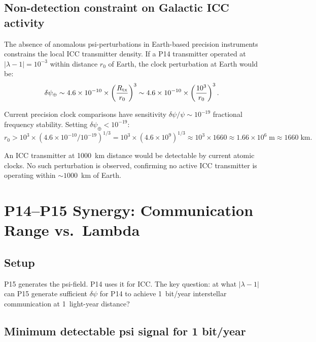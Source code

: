 \documentclass[11pt]{article}
\newcommand{\ee}[1]{\times 10^{#1}}
\begin{document}
\subsection{Non-detection constraint on Galactic ICC activity}

The absence of anomalous psi-perturbations in Earth-based precision
instruments constrains the local ICC transmitter density. If a
P14 transmitter operated at $|\lambda-1| = 10^{-3}$ within
distance $r_0$ of Earth, the clock perturbation at Earth would be:
\begin{equation}
\delta\psi_\oplus \sim 4.6\ee{-10} \times \left(\frac{R_{\rm tx}}{r_0}\right)^3
\sim 4.6\ee{-10} \times \left(\frac{10^3}{r_0}\right)^3.
\end{equation}

Current precision clock comparisons have sensitivity
$\delta\psi/\psi \sim 10^{-19}$ fractional frequency stability.
Setting $\delta\psi_\oplus < 10^{-19}$:
\begin{equation}
r_0 > 10^3 \times (4.6\ee{-10}/10^{-19})^{1/3} = 10^3 \times (4.6\ee{9})^{1/3}
\approx 10^3 \times 1660 \approx 1.66\ee{6}\;\text{m} \approx 1660\;\text{km}.
\end{equation}

An ICC transmitter at 1000~km distance would be detectable by
current atomic clocks. No such perturbation is observed, confirming
no active ICC transmitter is operating within $\sim 1000$~km of Earth.

\section{P14--P15 Synergy: Communication Range vs.\ Lambda}
\label{sec:p14-p15-synergy}

\subsection{Setup}

P15 generates the psi-field. P14 uses it for ICC. The key question:
at what $|\lambda-1|$ can P15 generate sufficient $\delta\psi$ for
P14 to achieve 1~bit/year interstellar communication at 1~light-year
distance?

\subsection{Minimum detectable psi signal for 1 bit/year}
\end{document}
